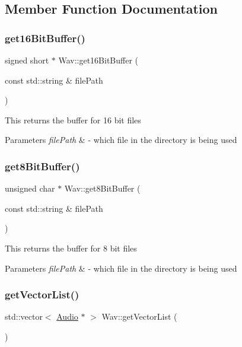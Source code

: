 \subsection{Member Function Documentation}
\mbox{\label{classWav_af1315b1ca824a7eadc2e85791004f884}} 
\subsubsection{\texorpdfstring{get16\+Bit\+Buffer()}{get16BitBuffer()}}
{\footnotesize\ttfamily signed short $\ast$ Wav\+::get16\+Bit\+Buffer (\begin{DoxyParamCaption}\item[{const std\+::string \&}]{file\+Path }\end{DoxyParamCaption})}

This returns the buffer for 16 bit files 
\begin{DoxyParams}{Parameters}
{\em file\+Path} & -\/ which file in the directory is being used \\
\hline
\end{DoxyParams}
\mbox{\label{classWav_a071344357789033b5afffbbbfbb5581b}} 
\subsubsection{\texorpdfstring{get8\+Bit\+Buffer()}{get8BitBuffer()}}
{\footnotesize\ttfamily unsigned char $\ast$ Wav\+::get8\+Bit\+Buffer (\begin{DoxyParamCaption}\item[{const std\+::string \&}]{file\+Path }\end{DoxyParamCaption})}

This returns the buffer for 8 bit files 
\begin{DoxyParams}{Parameters}
{\em file\+Path} & -\/ which file in the directory is being used \\
\hline
\end{DoxyParams}
\mbox{\label{classWav_a68f79590f248a0db8f191f9e8d2d6672}} 
\subsubsection{\texorpdfstring{get\+Vector\+List()}{getVectorList()}}
{\footnotesize\ttfamily std\+::vector$<$ \hyperlink{classAudio}{Audio} $\ast$ $>$ Wav\+::get\+Vector\+List (\begin{DoxyParamCaption}{ }\end{DoxyParamCaption})}

